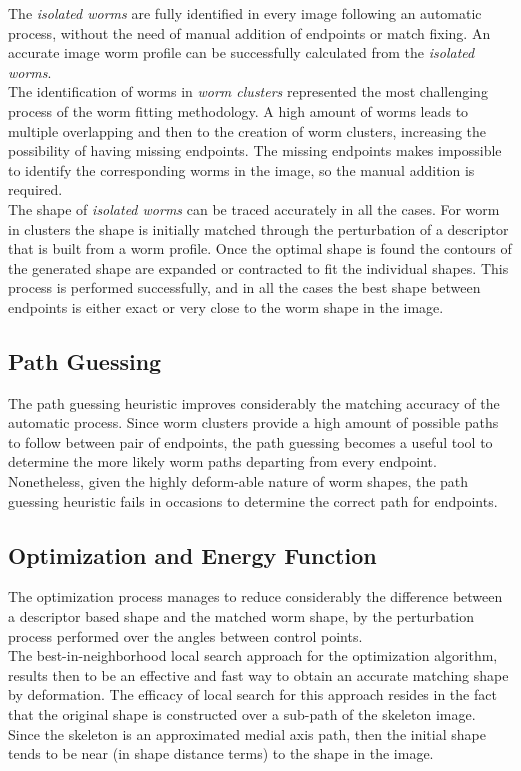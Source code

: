 The \emph{isolated worms} are fully identified in every image following
an automatic process, without the need of manual addition of endpoints
or match fixing. An accurate image worm profile can be successfully 
calculated from the \emph{isolated worms}.\\
The identification of worms in \emph{worm clusters} represented the most 
challenging process of the worm fitting methodology. A high amount
of worms leads to multiple overlapping and then to the creation of worm 
clusters, increasing the possibility of having missing endpoints. The missing
endpoints makes impossible to identify the corresponding worms in the image,
so the manual addition is required.\\
The shape of \emph{isolated worms} can be traced accurately in all the cases.
For worm in clusters the shape is initially matched through the perturbation
of a descriptor that is built from a worm profile. Once the optimal shape
is found the contours of the generated shape are expanded or contracted
to fit the individual shapes. This process is performed successfully, and in
all the cases the best shape between endpoints is either exact or very close
to the worm shape in the image.

\subsection*{Path Guessing}

The path guessing heuristic improves considerably the matching accuracy
of the automatic process. Since worm clusters provide a high amount of 
possible paths to follow between pair of endpoints, the path guessing
becomes a useful tool to determine the more likely worm paths departing
from every endpoint. Nonetheless, given the highly deform-able nature
of worm shapes, the path guessing heuristic fails in occasions to determine
the correct path for endpoints.

\subsection*{Optimization and Energy Function}
The optimization process manages to reduce considerably the difference
between a descriptor based shape
and the matched worm shape, by the perturbation process performed over
the angles between control points. \\
The best-in-neighborhood local search approach for the optimization algorithm,
results then to be an effective and fast way to obtain an accurate matching
shape by deformation. The efficacy of local search for this approach resides
in the fact that the original shape is constructed over a sub-path of the
skeleton image. Since the skeleton is an approximated medial axis path, then
the initial shape tends to be near (in shape distance terms) to the shape 
in the image.\\

